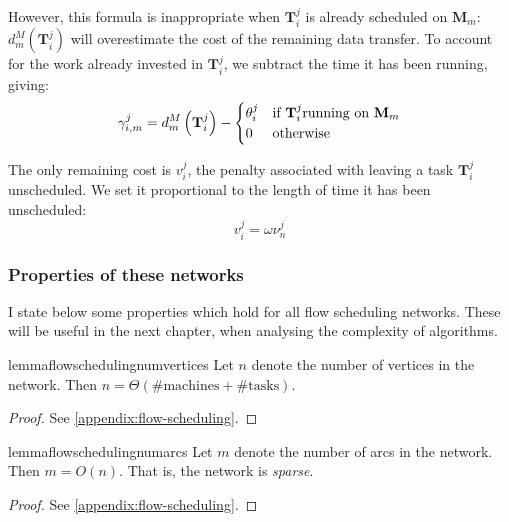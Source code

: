 However, this formula is inappropriate when $\mathbf{T}_{i}^{j}$ is already scheduled on  $\mathbf{M}_m$: $d^M_m\left(\mathbf{T}_{i}^{j}\right)$ will overestimate the cost of the remaining data transfer. To account for the work already invested in $\mathbf{T}_{i}^{j}$, we subtract the time it has been running, giving:
\[\gamma_{i,m}^{j} = d_{m}^{M}\left(\mathbf{T}_{i}^{j}\right)-\begin{cases}
\theta_{i}^{j} & \text{if \ensuremath{\mathbf{T}_{i}^{j}}running on \ensuremath{\mathbf{M}_{m}}}\\
0 & \text{otherwise}
\end{cases}\]

The only remaining cost is $v_i^j$, the penalty associated with leaving a task $\mathbf{T}_{i}^{j}$ unscheduled. We set it proportional to the length of time it has been unscheduled:
\[v_i^j = \omega\nu_{n}^{j}\]

\subsubsection{Properties of these networks}


I state below some properties which hold for all flow scheduling networks. These will be useful in the next chapter, when analysing the complexity of algorithms. \\

\begin{restatable}{lemma}{flowschedulingnumvertices}
\label{lemma:network-num-vertices}
Let $n$ denote the number of vertices in the network. Then $n = \Theta\left(\text{\# machines} + \text{\# tasks}\right)$.
\end{restatable}
\begin{proof}
See \cref{appendix:flow-scheduling}.
\end{proof}

\begin{restatable}{lemma}{flowschedulingnumarcs} 
\label{lemma:network-num-arcs}
Let $m$ denote the number of arcs in the network. Then $m = O(n)$. That is, the network is \emph{sparse}.
\end{restatable}
\begin{proof}
See \cref{appendix:flow-scheduling}.
\end{proof}

